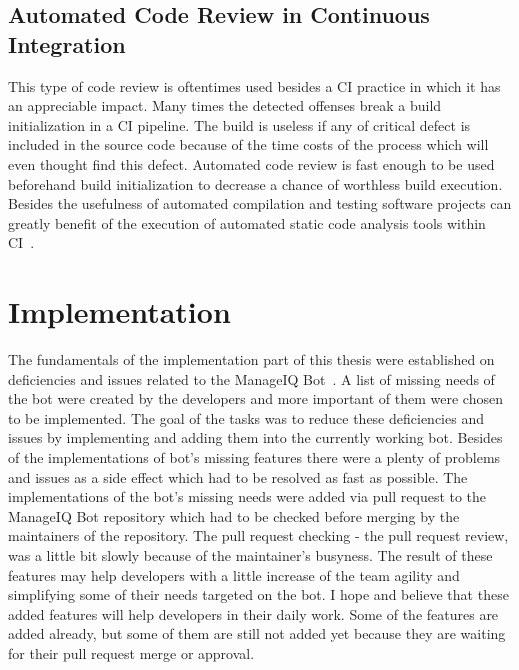 \section{Automated Code Review in Continuous Integration}

This type of code review is oftentimes used besides a CI practice in which it has an appreciable impact. Many times the detected offenses break a build initialization in a CI pipeline. The build is useless if any of critical defect is included in the source code because of the time costs of the process which will even thought find this defect. Automated code review is fast enough to be used beforehand build initialization to decrease a chance of worthless build execution. Besides the usefulness of automated compilation and testing software projects can greatly benefit of the execution of automated static code analysis tools within CI~\cite{SCA_in_CI}.\\

\chapter{Implementation}\label{chapter:implementation}

The fundamentals of the implementation part of this thesis were established on deficiencies and issues related to the ManageIQ Bot~\cite{MIQBOT}. A list of missing needs of the bot were created by the developers and more important of them were chosen to be implemented. The goal of the tasks was to reduce these deficiencies and issues by implementing and adding them into the currently working bot. Besides of the implementations of bot's missing features there were a plenty of problems and issues as a side effect which had to be resolved as fast as possible. The implementations of the bot's missing needs were added via pull request to the ManageIQ Bot repository which had to be checked before merging by the maintainers of the repository. The pull request checking - the pull request review, was a little bit slowly because of the maintainer's busyness. The result of these features may help developers with a little increase of the team agility and simplifying some of their needs targeted on the bot. I hope and believe that these added features will help developers in their daily work. Some of the features are added already, but some of them are still not added yet because they are waiting for their pull request merge or approval.

